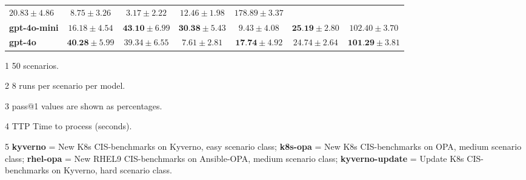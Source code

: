 \begin{table*}[h]
\begin{threeparttable}
\begin{tabular}{@{}lcccccc@{}}
    \cellcolor[gray]{0.93} $20.83 \pm 4.86$ &
    \cellcolor[gray]{0.96} $8.75 \pm 3.26$ &
    \cellcolor[gray]{0.98} $3.17 \pm 2.22$ &
    \cellcolor[gray]{0.93} $12.46 \pm 1.98$ &
    \cellcolor[gray]{0.97} $178.89 \pm 3.37$ \\
    \textbf{gpt-4o-mini} &
    \cellcolor[gray]{0.96} $16.18 \pm 4.54$ &
    \cellcolor[gray]{0.85} $\textbf{43.10} \pm 6.99$ &
    \cellcolor[gray]{0.85} $\textbf{30.38} \pm 5.43$ &
    \cellcolor[gray]{0.93} $9.43 \pm 4.08$ &
    \cellcolor[gray]{0.85} $\textbf{25.19} \pm 2.80$ &
    \cellcolor[gray]{0.85} $102.40 \pm 3.70$ \\
    \textbf{gpt-4o} &
    \cellcolor[gray]{0.85} $\textbf{40.28} \pm 5.99$ &
    \cellcolor[gray]{0.86} $39.34 \pm 6.55$ &
    \cellcolor[gray]{0.96} $7.61 \pm 2.81$ &
    \cellcolor[gray]{0.85} $\textbf{17.74} \pm 4.92$ &
    \cellcolor[gray]{0.85} $24.74 \pm 2.64$ &
    \cellcolor[gray]{0.85} $\textbf{101.29} \pm 3.81$ \\
    \bottomrule
  \end{tabular}
  \begin{tablenotes}
    \scriptsize
    \item[1] 50 scenarios.
    \item[2] 8 runs per scenario per model.
    \item[3] pass@1 values are shown as percentages.
    \item[4] TTP Time to process (seconds).\\
    \item[5] \textbf{kyverno} = New K8s CIS-benchmarks on Kyverno, easy scenario class; 
          \textbf{k8s-opa} = New K8s CIS-benchmarks on OPA, medium scenario class;
          \textbf{rhel-opa} = New RHEL9 CIS-benchmarks on Ansible-OPA, medium scenario class;
          \textbf{kyverno-update} = Update K8s CIS-benchmarks on Kyverno, hard scenario class.
  \end{tablenotes}
  \vspace{-10pt}
\end{threeparttable}
\end{table*}


